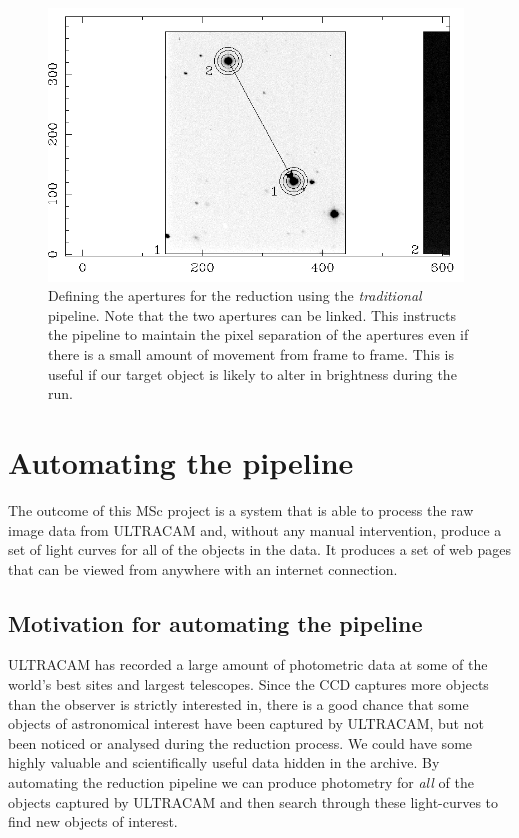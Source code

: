 \begin{figure}
\centering
\includegraphics[width=110mm]{images/setaper.png}
\caption{Defining the apertures for the reduction using the \emph{traditional} pipeline. Note that the two apertures can be linked. This instructs the pipeline to maintain the pixel separation of the apertures even if there is a small amount of movement from frame to frame. This is useful if our target object is likely to alter in brightness during the run.}
\label{fig:settingapertures}
\end{figure}

\section{Automating the pipeline}
The outcome of this MSc project is a system that is able to process the raw image data from ULTRACAM and, without any manual intervention, produce a set of light curves for all of the objects in the data. It produces a set of web pages that can be viewed from anywhere with an internet connection. 

\subsection{Motivation for automating the pipeline}
ULTRACAM has recorded a large amount of photometric data at some of the world's best sites and largest telescopes. Since the CCD captures more objects than the observer is strictly interested in, there is a good chance that some objects of astronomical interest have been captured by ULTRACAM, but not been noticed or analysed during the reduction process. We could have some highly valuable and scientifically useful data hidden in the archive. By automating the reduction pipeline we can produce photometry for \emph{all} of the objects captured by ULTRACAM and then search through these light-curves to find new objects of interest. 

